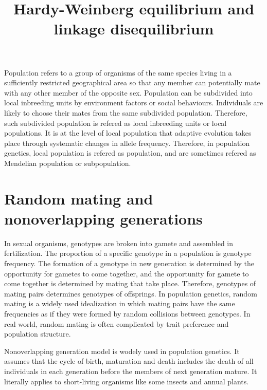 \documentclass[11pt]{article}
\title{Hardy-Weinberg equilibrium and linkage disequilibrium}
\author{}
\date{}
\begin{document}
\begin{sloppypar}
  \maketitle

  \linenumbers
Population refers to a group of organisms of the same species living in a sufficiently restricted geographical area so that any member can potentially mate with any other member of the opposite sex. 
Population can be subdivided into local inbreeding units by environment factors or social behaviours. 
Individuals are likely to choose their mates from the same subdivided population. 
Therefore, such subdivided population is refered as local inbreeding units or local populations. 
It is at the level of local population that adaptive evolution takes place through systematic changes in allele frequency. 
Therefore, in population genetics, local population is refered as population, and are sometimes refered as Mendelian population or subpopulation.

\section{Random mating and nonoverlapping generations}
In sexual organisms, genotypes are broken into gamete and assembled in fertilization. 
The proportion of a specific genotype in a population is genotype frequency. 
The formation of a genotype in new generation is determined by the opportunity for gametes to come together, and the opportunity for gamete to come together is determined by mating that take place. 
Therefore, genotypes of mating pairs determines genotypes of offsprings. 
In population genetics, random mating is a widely used idealization in which mating pairs have the same frequencies as if they were formed by random collisions between genotypes. 
In real world, random mating is often complicated by trait preference and population structure. 

\par

Nonoverlapping generation model is wodely used in population genetics. 
It assumes that the cycle of birth, maturation and death includes the death of all individuals in each generation before the members of next generation mature. 
It literally applies to short-living organisms like some insects and annual plants.


\end{sloppypar}
\end{document}
